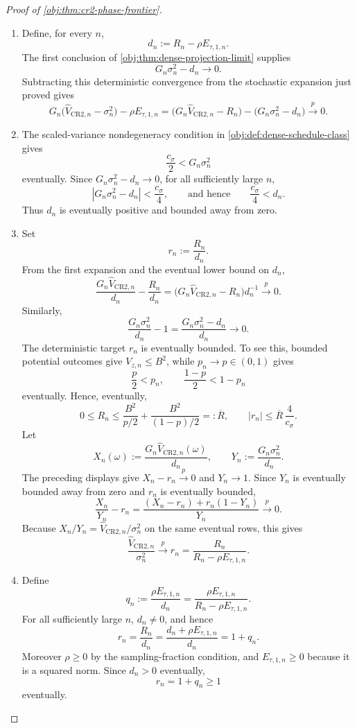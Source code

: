 \documentclass[11pt]{article}
\begin{document}
\begin{proof}[Proof of \cref{obj:thm:cr2-phase-frontier}]
\begin{enumerate}
\item Define, for every \(n\),
\[
d_n:=R_n-\rho E_{\tau,1,n}.
\]
The first conclusion of \cref{obj:thm:dense-projection-limit} supplies
\[
G_n\sigma_n^2-d_n\to0 .
\]
Subtracting this deterministic convergence from the stochastic expansion just proved gives
\[
G_n\bigl(\widehat V_{\mathrm{CR2},n}-\sigma_n^2\bigr)
-\rho E_{\tau,1,n}
=
\bigl(G_n\widehat V_{\mathrm{CR2},n}-R_n\bigr)
-
\bigl(G_n\sigma_n^2-d_n\bigr)
\xrightarrow{p}0 .
\]

\item The scaled-variance nondegeneracy condition in \cref{obj:def:dense-schedule-class} gives
\[
\frac{c_\sigma}{2}<G_n\sigma_n^2
\]
eventually. Since \(G_n\sigma_n^2-d_n\to0\), for all sufficiently large \(n\),
\[
\left|G_n\sigma_n^2-d_n\right|<\frac{c_\sigma}{4},
\qquad\text{and hence}\qquad
\frac{c_\sigma}{4}<d_n .
\]
Thus \(d_n\) is eventually positive and bounded away from zero. %

\item Set
\[
r_n:=\frac{R_n}{d_n}.
\]
From the first expansion and the eventual lower bound on \(d_n\),
\[
\frac{G_n\widehat V_{\mathrm{CR2},n}}{d_n}-\frac{R_n}{d_n}
=
\bigl(G_n\widehat V_{\mathrm{CR2},n}-R_n\bigr)d_n^{-1}
\xrightarrow{p}0 .
\]
Similarly,
\[
\frac{G_n\sigma_n^2}{d_n}-1
=
\frac{G_n\sigma_n^2-d_n}{d_n}
\to0 .
\]
The deterministic target \(r_n\) is eventually bounded. To see this, bounded potential outcomes give \(V_{z,n}\le B^2\), while \(p_n\to p\in(0,1)\) gives
\[
\frac{p}{2}<p_n,
\qquad
\frac{1-p}{2}<1-p_n
\]
eventually. Hence, eventually,
\[
0\le R_n
\le
\frac{B^2}{p/2}+
\frac{B^2}{(1-p)/2}
=:\overline R,
\qquad
|r_n|\le \overline R\,\frac{4}{c_\sigma} .
\]
Let
\[
X_n(\omega):=\frac{G_n\widehat V_{\mathrm{CR2},n}(\omega)}{d_n},
\qquad
Y_n:=\frac{G_n\sigma_n^2}{d_n} .
\]
The preceding displays give \(X_n-r_n\xrightarrow{p}0\) and \(Y_n\to1\). Since \(Y_n\) is eventually bounded away from zero and \(r_n\) is eventually bounded,
\[
\frac{X_n}{Y_n}-r_n
=
\frac{(X_n-r_n)+r_n(1-Y_n)}{Y_n}
\xrightarrow{p}0 .
\]
Because \(X_n/Y_n=\widehat V_{\mathrm{CR2},n}/\sigma_n^2\) on the same eventual rows, this gives
\[
\frac{\widehat V_{\mathrm{CR2},n}}{\sigma_n^2}
\xrightarrow{p}
r_n
=
\frac{R_n}{R_n-\rho E_{\tau,1,n}} .
\]

\item Define
\[
q_n:=\frac{\rho E_{\tau,1,n}}{d_n}
=
\frac{\rho E_{\tau,1,n}}{R_n-\rho E_{\tau,1,n}} .
\]
For all sufficiently large \(n\), \(d_n\ne0\), and hence
\[
r_n
=
\frac{R_n}{d_n}
=
\frac{d_n+\rho E_{\tau,1,n}}{d_n}
=
1+q_n .
\]
Moreover \(\rho\ge0\) by the sampling-fraction condition, and \(E_{\tau,1,n}\ge0\) because it is a squared norm. Since \(d_n>0\) eventually,
\[
r_n=1+q_n\ge1
\]
eventually. %


\end{enumerate}
\end{proof}
\end{document}
